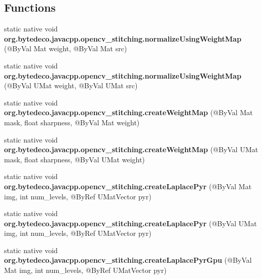 \subsection*{Functions}
\begin{DoxyCompactItemize}
\item 
\mbox{\label{group__stitching__blend_gaf909c95991b972cb25d66ae200913362}} 
static native void {\bfseries org.\+bytedeco.\+javacpp.\+opencv\+\_\+stitching.\+normalize\+Using\+Weight\+Map} (@By\+Val Mat weight, @By\+Val Mat src)
\item 
\mbox{\label{group__stitching__blend_ga37f11aa0fc029f62993457d003141381}} 
static native void {\bfseries org.\+bytedeco.\+javacpp.\+opencv\+\_\+stitching.\+normalize\+Using\+Weight\+Map} (@By\+Val U\+Mat weight, @By\+Val U\+Mat src)
\item 
\mbox{\label{group__stitching__blend_ga17d877120650db5264487064153f36a1}} 
static native void {\bfseries org.\+bytedeco.\+javacpp.\+opencv\+\_\+stitching.\+create\+Weight\+Map} (@By\+Val Mat mask, float sharpness, @By\+Val Mat weight)
\item 
\mbox{\label{group__stitching__blend_gabda068acfbfb807a909b70de62c38de1}} 
static native void {\bfseries org.\+bytedeco.\+javacpp.\+opencv\+\_\+stitching.\+create\+Weight\+Map} (@By\+Val U\+Mat mask, float sharpness, @By\+Val U\+Mat weight)
\item 
\mbox{\label{group__stitching__blend_ga5edc4ae96e6d6e748c24a8047154c9da}} 
static native void {\bfseries org.\+bytedeco.\+javacpp.\+opencv\+\_\+stitching.\+create\+Laplace\+Pyr} (@By\+Val Mat img, int num\+\_\+levels, @By\+Ref U\+Mat\+Vector pyr)
\item 
\mbox{\label{group__stitching__blend_ga97df0549df4ae003daa435abcdacc160}} 
static native void {\bfseries org.\+bytedeco.\+javacpp.\+opencv\+\_\+stitching.\+create\+Laplace\+Pyr} (@By\+Val U\+Mat img, int num\+\_\+levels, @By\+Ref U\+Mat\+Vector pyr)
\item 
\mbox{\label{group__stitching__blend_gabd16dbbbd84eb1af704ee68c7f3e7b36}} 
static native void {\bfseries org.\+bytedeco.\+javacpp.\+opencv\+\_\+stitching.\+create\+Laplace\+Pyr\+Gpu} (@By\+Val Mat img, int num\+\_\+levels, @By\+Ref U\+Mat\+Vector pyr)

\end{DoxyCompactItemize}
